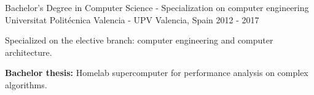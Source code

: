 \begin{cventries}

\cventry
{Bachelor's Degree in Computer Science  - Specialization on computer engineering} %
{Universitat Politécnica Valencia - UPV} %
{Valencia, Spain} %
{2012 - 2017} %
{ 
\begin{cvitems}
\item{Specialized on the elective branch: computer engineering and computer architecture.}
\item{\textbf{Bachelor thesis:} Homelab supercomputer for performance analysis on complex algorithms.}
\end{cvitems}
}

\end{cventries}
